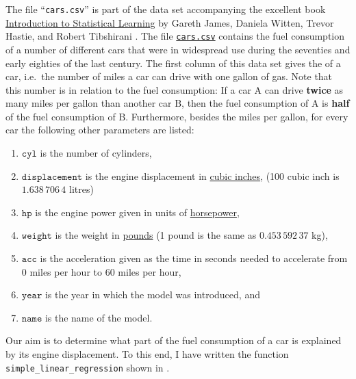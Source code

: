 The file ``\texttt{cars.csv}'' is part of the data set accompanying the excellent book 
\href{https://www.statlearning.com}{Introduction to Statistical Learning} by Gareth James,
Daniela Witten, Trevor Hastie, and Robert Tibshirani \cite{james:2014}.  The file
\href{https://www.statlearning.com/s/Auto.csv}{\texttt{cars.csv}} contains the fuel consumption of a number of
different cars that were in widespread use during 
the seventies and early eighties of the last century.  The first column of this data set gives the 
 of a car, i.e.~the number of miles a car can drive with one gallon of gas.  Note that
this number is in  relation to the fuel consumption:  If a car $\mathrm{A}$ can drive \textbf{twice} as many miles per gallon
than another car $\mathrm{B}$, then the fuel consumption of $\mathrm{A}$ is \textbf{half} of the fuel consumption of
$\mathrm{B}$. Furthermore, besides the miles per gallon, for every car the following other parameters are listed:
\begin{enumerate}
\item $\mathtt{cyl}$ is the number of cylinders,
\item $\mathtt{displacement}$ is the engine displacement in
      \href{https://en.wikipedia.org/wiki/Cubic_inch}{cubic inches},  
      (100 cubic inch is $1.638\,706\,4$ litres)
\item $\mathtt{hp}$ is the engine power given in units of \href{https://en.wikipedia.org/wiki/Horsepower}{horsepower},
\item $\mathtt{weight}$ is the weight in \href{https://en.wikipedia.org/wiki/Pound_(mass)}{pounds} (1 pound is
      the same as $0.453\,592\,37$ kg), 
\item $\mathtt{acc}$ is the acceleration given as the time in seconds needed to accelerate from 0 miles per
      hour to 60 miles per hour,
\item $\mathtt{year}$ is the year in which the model was introduced, and
\item $\mathtt{name}$ is the name of the model.
\end{enumerate}
Our aim is to determine what part of the fuel consumption of a car is explained by its engine displacement.
To this end, I have written the function \texttt{simple\_linear\_regression} shown in .


